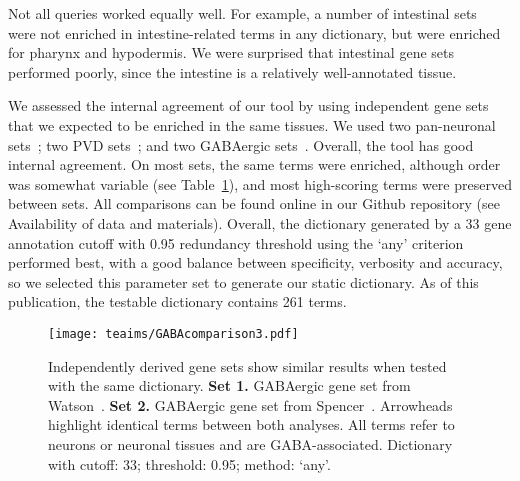 Not all queries worked equally well. For example, a number of intestinal
sets~\citep{Spencer2011, Pauli2006} were not enriched in intestine-related terms
in any dictionary, but were enriched for pharynx and hypodermis. We were
surprised that intestinal gene sets performed poorly, since the intestine is a
relatively well-annotated tissue.

We assessed the internal agreement of our tool by using independent gene sets
that we expected to be enriched in the same tissues. We used two  pan-neuronal
sets~\citep{Spencer2011, Watson2008a}; two PVD sets~\citep{Spencer2011, Smith2010};
and two  GABAergic sets~\citep{Spencer2011, Cinar2005}. Overall, the tool has
good internal agreement. On most sets, the same terms were enriched, although
order was somewhat variable (see Table~\ref{fig:interagree}), and most
high-scoring terms were preserved between sets. All comparisons can be found
online in our Github repository (see Availability of data and materials).
Overall, the dictionary generated by a 33 gene annotation cutoff with 0.95
redundancy threshold using the `any' criterion performed best, with a good
balance between specificity, verbosity and accuracy, so we selected this
parameter set to generate our static dictionary. As of this publication, the
testable dictionary contains 261 terms.

\begin{figure}
	\centering{}
  \texttt{[image: teaims/GABAcomparison3.pdf]}
  \caption{
  Independently derived gene sets show similar results 	when tested
  with the same dictionary.
  \textbf{Set 1.} GABAergic gene set from Watson~\citep{Watson2008a}.
  \textbf{Set 2.} GABAergic gene set from Spencer~\citep{Spencer2011}.
  Arrowheads highlight identical terms between both analyses. All terms refer to
  neurons or neuronal tissues and are GABA-associated. Dictionary with cutoff:
  33; threshold: 0.95; method: `any'.}
\label{fig:interagree}
\end{figure}


